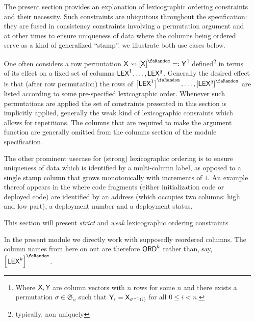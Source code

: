 The present section provides an explanation of lexicographic ordering constraints and their necessity.  Such constraints are ubiquitous throughout the \zkEvm{} specification: they are fused in consistency constraints involving a permutation argument and at other times to ensure uniqueness of data where the columns being ordered serve as a kind of generalized ``stamp''. we illustrate both use cases below.

One often considers a row permutation $\col{X}\rightsquigarrow \order{\col{X}} =: \col{Y}$\footnote{Where $\textsf{X}, \textsf{Y}$ are column vectors with $n$ rows for some $n$ and there exists a permutation $\sigma\in\mathfrak{S}_n$ such that $\textsf{Y}_i = \textsf{X}_{\sigma^{-1}(i)}$ for all $0\leq i < n$.} defined\footnote{typically, non uniquely} in terms of its effect on a fixed set of columns $\textsf{LEX}^{1},\dots,\textsf{LEX}^{q}$. Generally the desired effect is that (after row permutation) the rows of $\order{\lex^{1}},\dots,\order{\lex^{q}}$ are listed according to some pre-specified lexicographic order. Whenever such permutations are applied the set of constraints presented in this section is implicitly applied, generally the weak kind of lexicographic consraints which allows for repetitions. The columns that are required to make the argument function are generally omitted from the columns section of the module specification.

The other prominent usecase for (strong) lexicographic ordering is to ensure uniqueness of data which is identified by a multi-column label, as opposed to a single stamp column that grows monotonically with increments of $1$. An example thereof appears in the \romMod{} where code fragments (either initialization code or deployed code) are identified by an address (which occupies two columns: high and low part), a deployment number and a deployment status.

\saNote{} This section will present \emph{strict} and \emph{weak} lexicographic ordering constraints

\saNote{} In the present module we directly work with supposedly reordered columns. The column names from here on out are therefore $\textsf{ORD}^k$ rather than, say, $\order{\lex^{k}}$.  

